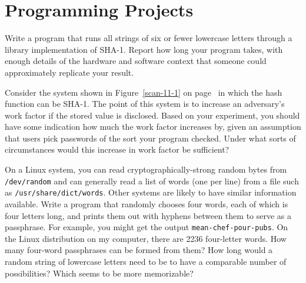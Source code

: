 \section*{Programming Projects}

\begin{chapterEnumerate}

\item
Write a program that runs all strings of six or fewer lowercase
letters through a library implementation of SHA-1.  Report how long
your program takes, with enough details of the hardware and software
context that someone could approximately replicate your result.

Consider the system shown in Figure~\ref{scan-11-1} on
page~\pageref{scan-11-1} in which the hash function can be SHA-1.
The point of this system is to increase an adversary's work factor if
the stored value is disclosed.  Based on your experiment, you should
have some indication how much the work factor increases by, given an
assumption that users pick passwords of the sort your program
checked.  Under what sorts of circumstances would this increase in
work factor be sufficient?

\item

On a Linux system, you can read cryptographically-strong random bytes
from {\tt /dev/random} and can generally read a list of words (one
per line) from a file such as {\tt /usr/share/dict/words}.
Other systems are likely to have similar information available.  Write
a program that randomly chooses four words, each of which is four
letters long, and prints them
out with hyphens between them to serve as a passphrase.  For
example, you might get the output {\tt mean-chef-pour-pubs}.  On the
Linux distribution on my computer, there are 2236 four-letter
words.  How many four-word passphrases can be formed from them?  How
long would a random string of lowercase letters need to be to have a
comparable number of possibilities?  Which seems to be more memorizable?

\end{chapterEnumerate}


